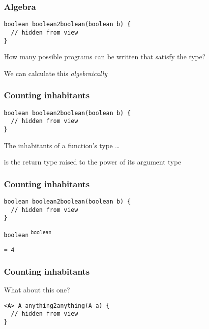 \begin{frame}[fragile]
\frametitle{Algebra}
\begin{block}{}
\begin{lstlisting}[style=java]
boolean boolean2boolean(boolean b) {
  // hidden from view 
}
\end{lstlisting}
\end{block}
\begin{center}
How many possible programs can be written that satisfy the type?

We can calculate this \emph{algebraically}
\end{center}
\end{frame}

\begin{frame}[fragile]
\frametitle{Counting inhabitants}
\begin{block}{}
\begin{lstlisting}[style=java]
boolean boolean2boolean(boolean b) {
  // hidden from view 
}
\end{lstlisting}
\end{block}
\begin{center}
The inhabitants of a function's type \ldots

is the return type raised to the power of its argument type
\end{center}
\end{frame}

\begin{frame}[fragile]
\frametitle{Counting inhabitants}
\begin{block}{}
\begin{lstlisting}[style=java]
boolean boolean2boolean(boolean b) {
  // hidden from view 
}
\end{lstlisting}
\end{block}
\begin{block}{}
\lstinline{boolean} \textsuperscript{\lstinline{boolean}}

\lstinline{= 4}
\end{block}
\end{frame}

\begin{frame}[fragile]
\frametitle{Counting inhabitants}
\begin{block}{What about this one?}
\begin{lstlisting}[style=java]
<A> A anything2anything(A a) {
  // hidden from view 
}
\end{lstlisting}
\end{block}
\end{frame}

